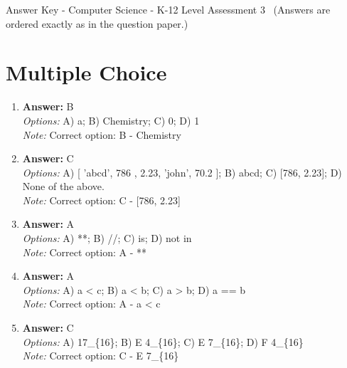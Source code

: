 \documentclass[12pt]{article}
\begin{document}
\begin{center}
Answer Key - Computer Science - K-12 Level Assessment 3 \
\small (Answers are ordered exactly as in the question paper.)
\end{center}

\section*{Multiple Choice}
\begin{enumerate}[label=\arabic*.]
\item \textbf{Answer:} B
\\ \textit{Options:} A) a; B) Chemistry; C) 0; D) 1
\\ \textit{Note:} Correct option: B - Chemistry
\item \textbf{Answer:} C
\\ \textit{Options:} A) [ 'abcd', 786 , 2.23, 'john', 70.2 ]; B) abcd; C) [786, 2.23]; D) None of the above.
\\ \textit{Note:} Correct option: C - [786, 2.23]
\item \textbf{Answer:} A
\\ \textit{Options:} A) **; B) //; C) is; D) not in
\\ \textit{Note:} Correct option: A - **
\item \textbf{Answer:} A
\\ \textit{Options:} A) a \textless{} c; B) a \textless{} b; C) a \textgreater{} b; D) a == b
\\ \textit{Note:} Correct option: A - a \textless{} c
\item \textbf{Answer:} C
\\ \textit{Options:} A) 17\_\{16\}; B) E 4\_\{16\}; C) E 7\_\{16\}; D) F 4\_\{16\}
\\ \textit{Note:} Correct option: C - E 7\_\{16\}
\end{enumerate}
\end{document}
